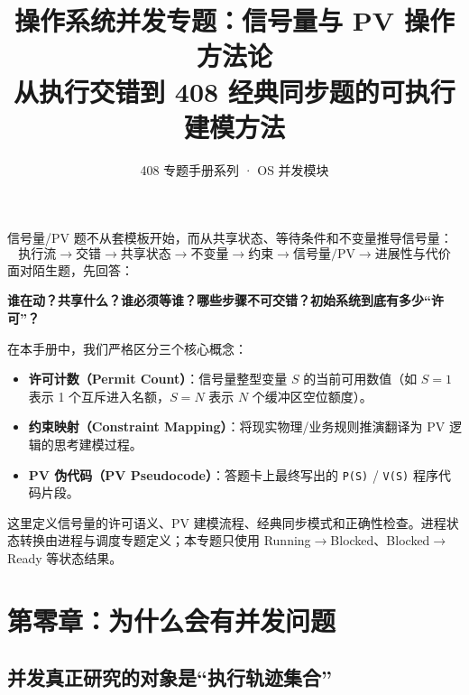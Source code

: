 \documentclass[11pt,a4paper]{ctexart}
\title{\vspace{-1.2cm}\textbf{操作系统并发专题：信号量与 PV 操作方法论}\\[0.45em]
\large 从执行交错到 408 经典同步题的可执行建模方法}
\author{408 专题手册系列 · OS 并发模块}
\date{}
\newcommand{\kw}[1]{\textbf{#1}}
\newcommand{\code}[1]{\texttt{#1}}
\begin{document}
\maketitle

\begin{corebox}
信号量/PV 题不从套模板开始，而从共享状态、等待条件和不变量推导信号量：
\[
\boxed{
\text{执行流}
\to\text{交错}
\to\text{共享状态}
\to\text{不变量}
\to\text{约束}
\to\text{信号量/PV}
\to\text{进展性与代价}
}
\]
面对陌生题，先回答：
\begin{center}
\bfseries 谁在动？共享什么？谁必须等谁？哪些步骤不可交错？初始系统到底有多少“许可”？
\end{center}

在本手册中，我们严格区分三个核心概念：
\begin{itemize}[leftmargin=1.5em]
\item \kw{许可计数（Permit Count）}：信号量整型变量 $S$ 的当前可用数值（如 $S=1$ 表示 1 个互斥进入名额，$S=N$ 表示 $N$ 个缓冲区空位额度）。
\item \kw{约束映射（Constraint Mapping）}：将现实物理/业务规则推演翻译为 PV 逻辑的思考建模过程。
\item \kw{PV 伪代码（PV Pseudocode）}：答题卡上最终写出的 \code{P(S)} / \code{V(S)} 程序代码片段。
\end{itemize}
\end{corebox}

\begin{method}[内容边界]
这里定义信号量的许可语义、PV 建模流程、经典同步模式和正确性检查。进程状态转换由进程与调度专题定义；本专题只使用 Running$\to$Blocked、Blocked$\to$Ready 等状态结果。
\end{method}

\tableofcontents
\newpage

\section{第零章：为什么会有并发问题}

\subsection{并发真正研究的对象是“执行轨迹集合”}
\end{document}
